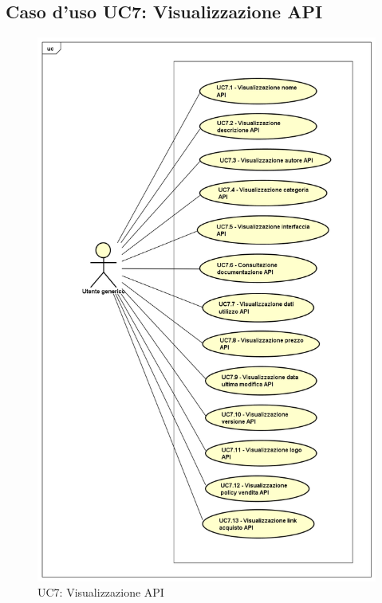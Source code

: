 \newpage
\subsection{Caso d'uso UC7: Visualizzazione API}
\label{UC7}
\begin{figure}[ht]
	\centering
	\includegraphics[scale=0.45]{UML/UC7.png}
	\caption{UC7: Visualizzazione API}
\end{figure}

